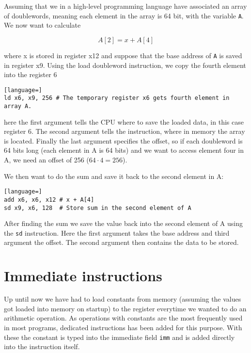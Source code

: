     Assuming that we in a high-level programming language have associated an array of doublewords, meaning each element in the array is 64 bit, with the variable \texttt{A}. We now want to calculate
    
    \begin{equation}
        A[2] = x + A[4]
    \end{equation}
    
    where x is stored in register x12 and suppose that the base address of \texttt{A} is saved in register x9. Using the load doubleword instruction, we copy the fourth element into the register 6
    \begin{lstlisting}[language=]
ld x6, x9, 256 # The temporary register x6 gets fourth element in array A.
    \end{lstlisting}
    here the first argument tells the CPU where to save the loaded data, in this case register 6. The second argument tells the instruction, where in memory the array is located. Finally the last argument specifies the offset, so if each doubleword is 64 bits long (each element in A is 64 bits) and we want to access element four in A, we need an offset of 256 ($64\cdot 4=256$).
    
    We then want to do the sum and save it back to the second element in A:
    \begin{lstlisting}[language=]
add x6, x6, x12 # x + A[4]
sd x9, x6, 128  # Store sum in the second element of A 
    \end{lstlisting}
    
    After finding the sum we save the value back into the second element of A using the \texttt{sd} instruction. Here the first argument takes the base address and third argument the offset. The second argument then contains the data to be stored. 
    
    
    
\section{Immediate instructions}
    Up until now we have had to load constants from memory (assuming the values got loaded into memory on startup) to the register everytime we wanted to do an arithmetic operation. As operations with constants are the most frequently used in most programs, dedicated instructions has been added for this purpose. With these the constant is typed into the immediate field \texttt{imm} and is added directly into the instruction itself. 
    
